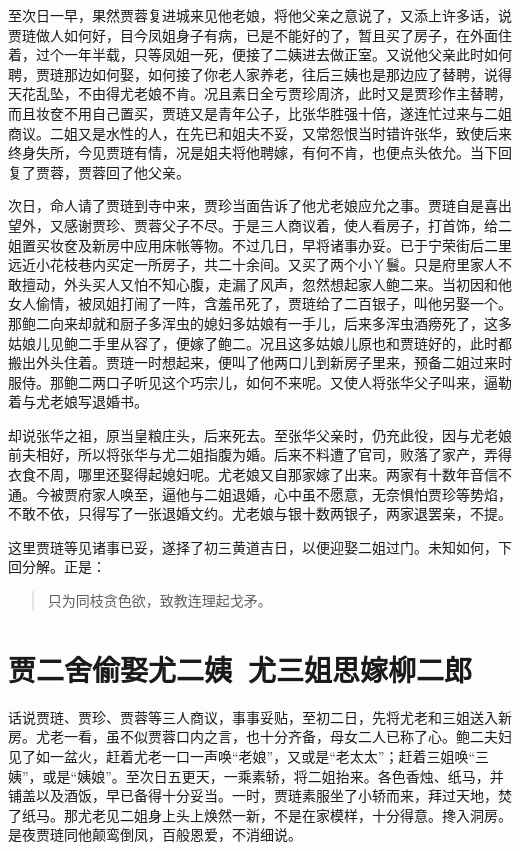 \documentclass[12pt,oneside]{book}
\newenvironment{shici}{%
\begin{verse}%
\centering\large\hspace{12pt}}%
{\end{verse}}
\begin{document}
至次日一早，果然贾蓉复进城来见他老娘，将他父亲之意说了，又添上许多话，说贾琏做人如何好，目今凤姐身子有病，已是不能好的了，暂且买了房子，在外面住着，过个一年半载，只等凤姐一死，便接了二姨进去做正室。又说他父亲此时如何聘，贾琏那边如何娶，如何接了你老人家养老，往后三姨也是那边应了替聘，说得天花乱坠，不由得尤老娘不肯。况且素日全亏贾珍周济，此时又是贾珍作主替聘，而且妆奁不用自己置买，贾琏又是青年公子，比张华胜强十倍，遂连忙过来与二姐商议。二姐又是水性的人，在先已和姐夫不妥，又常怨恨当时错许张华，致使后来终身失所，今见贾琏有情，况是姐夫将他聘嫁，有何不肯，也便点头依允。当下回复了贾蓉，贾蓉回了他父亲。

次日，命人请了贾琏到寺中来，贾珍当面告诉了他尤老娘应允之事。贾琏自是喜出望外，又感谢贾珍、贾蓉父子不尽。于是三人商议着，使人看房子，打首饰，给二姐置买妆奁及新房中应用床帐等物。不过几日，早将诸事办妥。已于宁荣街后二里远近小花枝巷内买定一所房子，共二十余间。又买了两个小丫鬟。只是府里家人不敢擅动，外头买人又怕不知心腹，走漏了风声，忽然想起家人鲍二来。当初因和他女人偷情，被凤姐打闹了一阵，含羞吊死了，贾琏给了二百银子，叫他另娶一个。那鲍二向来却就和厨子多浑虫的媳妇多姑娘有一手儿，后来多浑虫酒痨死了，这多姑娘儿见鲍二手里从容了，便嫁了鲍二。况且这多姑娘儿原也和贾琏好的，此时都搬出外头住着。贾琏一时想起来，便叫了他两口儿到新房子里来，预备二姐过来时服侍。那鲍二两口子听见这个巧宗儿，如何不来呢。又使人将张华父子叫来，逼勒着与尤老娘写退婚书。

却说张华之祖，原当皇粮庄头，后来死去。至张华父亲时，仍充此役，因与尤老娘前夫相好，所以将张华与尤二姐指腹为婚。后来不料遭了官司，败落了家产，弄得衣食不周，哪里还娶得起媳妇呢。尤老娘又自那家嫁了出来。两家有十数年音信不通。今被贾府家人唤至，逼他与二姐退婚，心中虽不愿意，无奈惧怕贾珍等势焰，不敢不依，只得写了一张退婚文约。尤老娘与银十数两银子，两家退罢亲，不提。

这里贾琏等见诸事已妥，遂择了初三黄道吉日，以便迎娶二姐过门。未知如何，下回分解。正是：

\begin{shici}
只为同枝贪色欲，致教连理起戈矛。
\end{shici}



\chapter{贾二舍偷娶尤二姨~尤三姐思嫁柳二郎}
话说贾琏、贾珍、贾蓉等三人商议，事事妥贴，至初二日，先将尤老和三姐送入新房。尤老一看，虽不似贾蓉口内之言，也十分齐备，母女二人已称了心。鲍二夫妇见了如一盆火，赶着尤老一口一声唤“老娘”，又或是“老太太”；赶着三姐唤“三姨”，或是“姨娘”。至次日五更天，一乘素轿，将二姐抬来。各色香烛、纸马，并铺盖以及酒饭，早已备得十分妥当。一时，贾琏素服坐了小轿而来，拜过天地，焚了纸马。那尤老见二姐身上头上焕然一新，不是在家模样，十分得意。搀入洞房。是夜贾琏同他颠鸾倒凤，百般恩爱，不消细说。
\end{document}
